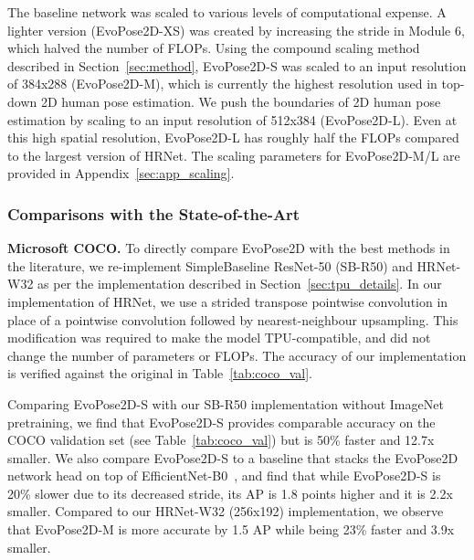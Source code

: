 \documentclass{ieeeaccess}
\begin{document}
The baseline network was scaled to various levels of computational expense. A lighter version (EvoPose2D-XS) was created by increasing the stride in Module 6, which halved the number of FLOPs. Using the compound scaling method described in Section~\ref{sec:method}, EvoPose2D-S was scaled to an input resolution of 384x288 (EvoPose2D-M), which is currently the highest resolution used in top-down 2D human pose estimation. We push the boundaries of 2D human pose estimation by scaling to an input resolution of 512x384 (EvoPose2D-L). Even at this high spatial resolution, EvoPose2D-L has roughly half the FLOPs compared to the largest version of HRNet. The scaling parameters for EvoPose2D-M/L are provided in Appendix~\ref{sec:app_scaling}.

\subsubsection{Comparisons with the State-of-the-Art}
\label{sec:sota}
\medskip\noindent\textbf{Microsoft COCO.} To directly compare EvoPose2D with the best methods in the literature, we re-implement SimpleBaseline ResNet-50 (SB-R50) and HRNet-W32 as per the implementation described in Section~\ref{sec:tpu_details}. In our implementation of HRNet, we use a strided transpose pointwise convolution in place of a pointwise convolution followed by nearest-neighbour upsampling. This modification was required to make the model TPU-compatible, and did not change the number of parameters or FLOPs. The accuracy of our implementation is verified against the original in Table~\ref{tab:coco_val}. 

Comparing EvoPose2D-S with our SB-R50 implementation without ImageNet pretraining, we find that EvoPose2D-S provides comparable accuracy on the COCO validation set (see Table~\ref{tab:coco_val}) but is 50\% faster and 12.7x smaller. We also compare EvoPose2D-S to a baseline that stacks the EvoPose2D network head on top of EfficientNet-B0~\cite{tan2019efficientnet}, and find that while EvoPose2D-S is 20\% slower due to its decreased stride, its AP is 1.8 points higher and it is 2.2x smaller. Compared to our HRNet-W32 (256x192) implementation, we observe that EvoPose2D-M is more accurate by 1.5 AP while being 23\% faster and 3.9x smaller. 
\end{document}
